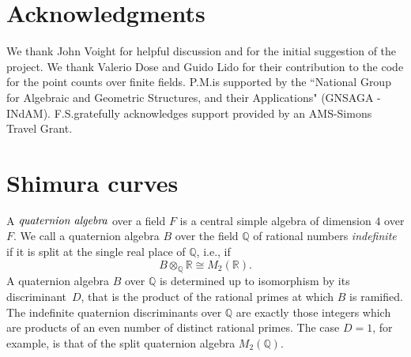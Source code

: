 \documentclass[11pt,reqno]{amsart}
\newcommand{\Q}{\mathbb{Q}}
\newcommand{\R}{\mathbb{R}}
\theoremstyle{definition}
\begin{document}
\section*{Acknowledgments}

We thank John Voight for helpful discussion and for the initial suggestion of the project. We thank Valerio Dose and Guido Lido for their contribution to the code for the point counts over finite fields. P.M.\@ is supported by the ``National Group for Algebraic and Geometric Structures, and their Applications" (GNSAGA - INdAM). F.S.\@ gratefully acknowledges support provided by an AMS-Simons Travel Grant.





\section{Shimura curves}\label{section: shimura_curves}

A $\emph{quaternion algebra}$ over a field $F$ is a central simple algebra of dimension $4$ over $F$. We call a quaternion algebra $B$ over the field $\Q$ of rational numbers \emph{indefinite} if it is split at the single real place of $\Q$, i.e., if
\[ B \otimes_\Q \R \cong M_2(\R). \]
A quaternion algebra $B$ over $\Q$ is determined up to isomorphism by its discriminant~$D$, that is the product of the rational primes at which $B$ is ramified. The indefinite quaternion discriminants over $\Q$ are exactly those integers which are products of an even number of distinct rational primes. The case $D=1$, for example, is that of the split quaternion algebra $M_2(\Q)$. 
\end{document}
